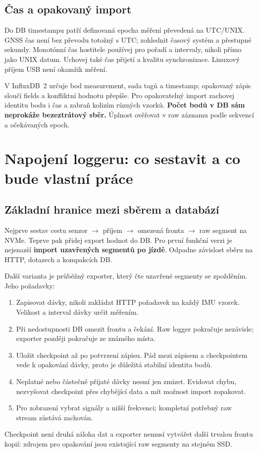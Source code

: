 \documentclass[11pt,a4paper]{article}
\begin{document}
\subsection{Čas a opakovaný import}
Do DB timestampu patří definovaná epocha měření převedená na UTC/UNIX. GNSS čas není bez převodu totožný s UTC; zohlednit časový systém a přestupné sekundy. Monotónní čas hostitele používej pro pořadí a intervaly, nikoli přímo jako UNIX datum. Uchovej také čas přijetí a kvalitu synchronizace. Linuxový příjem USB není okamžik měření.

V InfluxDB~2 určuje bod measurement, sada tagů a timestamp; opakovaný zápis sloučí fields a konfliktní hodnotu přepíše. Pro opakovatelný import zachovej identitu bodu i čas a zabraň kolizím různých vzorků. \textbf{Počet bodů v DB sám neprokáže bezeztrátový sběr.} Úplnost ověřovat v raw záznamu podle sekvencí a očekávaných epoch.\cite{influx-duplicates}

\clearpage
\section{Napojení loggeru: co sestavit a co bude vlastní práce}
\subsection{Základní hranice mezi sběrem a databází}
Nejprve sestav cestu senzor $\rightarrow$ příjem $\rightarrow$ omezená fronta $\rightarrow$ raw segment na NVMe. Teprve pak přidej export hodnot do DB. Pro první funkční verzi je nejsnazší \textbf{import uzavřených segmentů po jízdě}. Odpadne závislost sběru na HTTP, dotazech a kompakcích DB.

Další varianta je průběžný exporter, který čte uzavřené segmenty se zpožděním. Jeho požadavky:
\begin{enumerate}
\item Zapisovat dávky, nikoli zakládat HTTP požadavek na každý IMU vzorek. Velikost a interval dávky určit měřením.
\item Při nedostupnosti DB omezit frontu a čekání. Raw logger pokračuje nezávisle; exporter později pokračuje ze známého místa.
\item Uložit checkpoint až po potvrzení zápisu. Pád mezi zápisem a checkpointem vede k opakování dávky, proto je důležitá stabilní identita bodů.
\item Neplatné nebo částečně přijaté dávky nesmí jen zmizet. Evidovat chybu, nezvyšovat checkpoint přes chybějící data a mít možnost import zopakovat.
\item Pro zobrazení vybrat signály a nižší frekvenci; kompletní potřebný raw stream zůstává zachován.
\end{enumerate}
Checkpoint není druhá záloha dat a exporter nemusí vytvářet další trvalou frontu kopií: zdrojem pro opakování jsou existující raw segmenty na stejném SSD.
\end{document}
